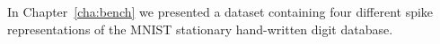 %
In Chapter~\ref{cha:bench} we presented a dataset containing four different spike representations of the MNIST stationary hand-written digit database. %
